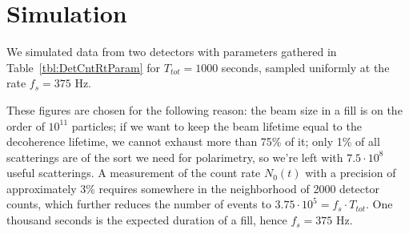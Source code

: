 \documentclass{article}
\newcommand{\vp}[2]{{#1}\cdot 10^{#2}}
\begin{document}
\section{Simulation}
We simulated data from two detectors with parameters gathered in Table~\ref{tbl:DetCntRtParam} for $T_{tot}=1000$ seconds, sampled uniformly at the rate $f_s = 375$ Hz.

These figures are chosen for the following reason: the beam size in a fill is on the order of $10^{11}$ particles; if we want to keep the beam lifetime equal to the decoherence lifetime, we cannot exhaust more than 75\% of it; only 1\% of all scatterings are of the sort we need for polarimetry, so we're left with $\vp{7.5}{8}$ useful scatterings. A measurement of the count rate $N_0(t)$ with a precision of approximately 3\% requires somewhere in the neighborhood of 2000 detector counts, which further reduces the number of events to $\vp{3.75}{5}= f_s\cdot T_{tot}$. One thousand seconds is the expected duration of a fill, hence $f_s = 375$ Hz. 
\end{document}
